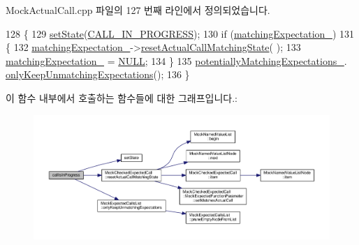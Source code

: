Mock\+Actual\+Call.\+cpp 파일의 127 번째 라인에서 정의되었습니다.


\begin{DoxyCode}
128 \{
129     \hyperlink{class_mock_checked_actual_call_acbfb5aa021e0d33ea6b83de2738a5424}{setState}(\hyperlink{class_mock_checked_actual_call_a51287301ad26cf1a31a1e33a4fd76e8ca4a60ea44a546fda90c0ec88ff6c185cf}{CALL\_IN\_PROGRESS});
130     \textcolor{keywordflow}{if} (\hyperlink{class_mock_checked_actual_call_aca733859eb143b7a7bf611a39d94d6f6}{matchingExpectation\_})
131     \{
132         \hyperlink{class_mock_checked_actual_call_aca733859eb143b7a7bf611a39d94d6f6}{matchingExpectation\_}->\hyperlink{class_mock_checked_expected_call_a4c7ee87e12972e0504de732ae6f90177}{resetActualCallMatchingState}(
      );
133         \hyperlink{class_mock_checked_actual_call_aca733859eb143b7a7bf611a39d94d6f6}{matchingExpectation\_} = \hyperlink{openavb__types__base__pub_8h_a070d2ce7b6bb7e5c05602aa8c308d0c4}{NULL};
134     \}
135     \hyperlink{class_mock_checked_actual_call_a4fc6bec7509ed6eb28096956758c030a}{potentiallyMatchingExpectations\_}.
      \hyperlink{class_mock_expected_calls_list_a5fb8122e66b99f6e196b29a0f6f1bd28}{onlyKeepUnmatchingExpectations}();
136 \}
\end{DoxyCode}


이 함수 내부에서 호출하는 함수들에 대한 그래프입니다.\+:
\nopagebreak
\begin{figure}[H]
\begin{center}
\leavevmode
\includegraphics[width=350pt]{class_mock_checked_actual_call_a60fd1e06699e3f79444c4e7f8055ac4a_cgraph}
\end{center}
\end{figure}




